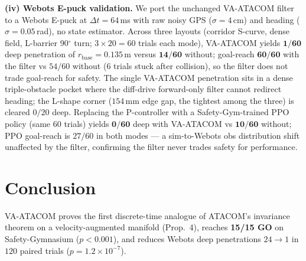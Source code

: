 \documentclass[letterpaper]{article}
\begin{document}
\textbf{(iv) Webots E-puck validation.} We port the unchanged VA-ATACOM filter to a Webots E-puck at $\Delta t{=}64$\,ms with raw noisy GPS ($\sigma{=}4$\,cm) and heading ($\sigma{=}0.05$\,rad), no state estimator. Across three layouts (corridor S-curve, dense field, L-barrier 90$^\circ$ turn; $3{\times}20{=}60$ trials each mode), VA-ATACOM yields $\mathbf{1/60}$ deep penetration of $r_\text{base}{=}0.135$\,m versus $\mathbf{14/60}$ without; goal-reach $\mathbf{60/60}$ with the filter vs $54/60$ without (6 trials stuck after collision), so the filter does not trade goal-reach for safety. The single VA-ATACOM penetration sits in a dense triple-obstacle pocket where the diff-drive forward-only filter cannot redirect heading; the L-shape corner ($154$\,mm edge gap, the tightest among the three) is cleared $0/20$ deep. Replacing the P-controller with a Safety-Gym-trained PPO policy (same 60 trials) yields $\mathbf{0/60}$ deep with VA-ATACOM vs $\mathbf{10/60}$ without; PPO goal-reach is $27/60$ in both modes --- a sim-to-Webots obs distribution shift unaffected by the filter, confirming the filter never trades safety for performance.

\section{Conclusion}

VA-ATACOM proves the first discrete-time analogue of ATACOM's invariance theorem on a velocity-augmented manifold (Prop.~4), reaches \textbf{15/15 GO} on Safety-Gymnasium ($p\!<\!0.001$), and reduces Webots deep penetrations $24\!\to\!1$ in $120$ paired trials ($p{=}1.2{\times}10^{-7}$).





\end{document}
